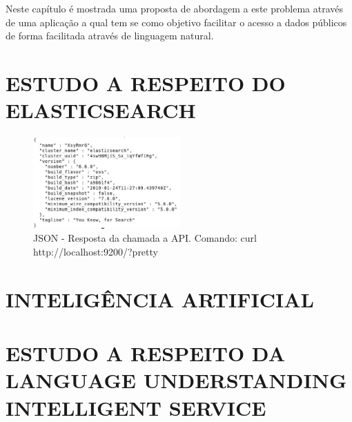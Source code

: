 Neste capítulo é mostrada uma proposta de abordagem a este problema através de uma aplicação a qual tem se como objetivo facilitar o acesso a dados públicos de forma facilitada através de linguagem natural.

\section{\uppercase{Estudo a respeito do Elasticsearch}}


\begin{figure}[!htb]
	\caption{\label{pretty}JSON - Resposta da chamada a API. Comando: curl http://localhost:9200/?pretty}
	\begin{center}
		\includegraphics[width=0.5\textwidth]{imagens/pretty.eps}
	\end{center}
\end{figure}

\section{\uppercase{Inteligência Artificial}}


\section{\uppercase{Estudo a respeito da Language Understanding Intelligent Service}}

